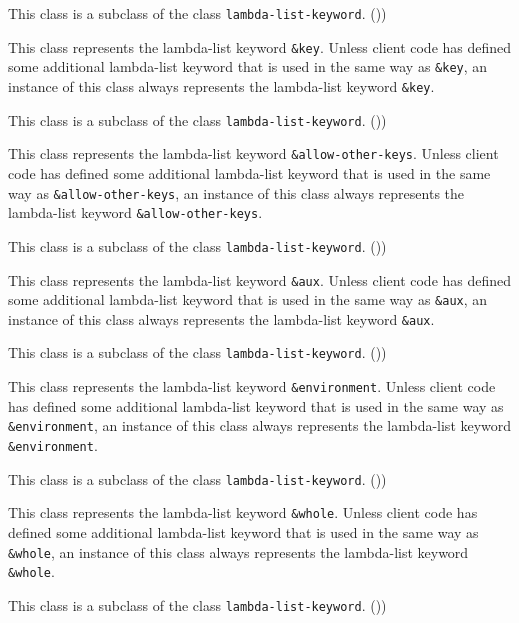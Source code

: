 This class is a subclass of the class \texttt{lambda-list-keyword}. ())


This class represents the lambda-list keyword \texttt{\&key}.
Unless client code has defined some additional lambda-list keyword
that is used in the same way as \texttt{\&key}, an instance of
this class always represents the lambda-list keyword
\texttt{\&key}.

This class is a subclass of the class \texttt{lambda-list-keyword}. ())


This class represents the lambda-list keyword \texttt{\&allow-other-keys}.
Unless client code has defined some additional lambda-list keyword
that is used in the same way as \texttt{\&allow-other-keys}, an instance of
this class always represents the lambda-list keyword
\texttt{\&allow-other-keys}.

This class is a subclass of the class \texttt{lambda-list-keyword}. ())


This class represents the lambda-list keyword \texttt{\&aux}.
Unless client code has defined some additional lambda-list keyword
that is used in the same way as \texttt{\&aux}, an instance of
this class always represents the lambda-list keyword
\texttt{\&aux}.

This class is a subclass of the class \texttt{lambda-list-keyword}. ())


This class represents the lambda-list keyword \texttt{\&environment}.
Unless client code has defined some additional lambda-list keyword
that is used in the same way as \texttt{\&environment}, an instance of
this class always represents the lambda-list keyword
\texttt{\&environment}.

This class is a subclass of the class \texttt{lambda-list-keyword}. ())


This class represents the lambda-list keyword \texttt{\&whole}.
Unless client code has defined some additional lambda-list keyword
that is used in the same way as \texttt{\&whole}, an instance of
this class always represents the lambda-list keyword
\texttt{\&whole}.

This class is a subclass of the class \texttt{lambda-list-keyword}. ())

